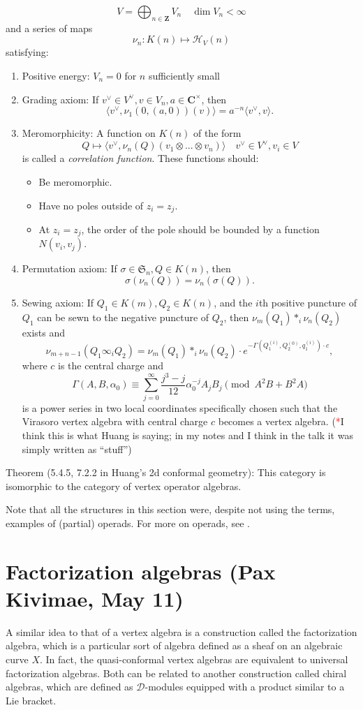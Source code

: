 \documentclass{article}
\newcommand{\CC}{\mathbold{C}}
\newcommand{\ZZ}{\mathbold{Z}}
\newcommand{\Hh}{\mathcal{H}}
\newcommand{\Dd}{\mathcal{D}}
\newcommand{\tk}{\textcolor{red}{*}}
\newcommand{\Sym}{\mathfrak{S}}
\begin{document}
\[V = \bigoplus_{n \in \ZZ} V_n \quad \dim V_n < \infty \]
and a series of maps
\[\nu_n: K(n) \mapsto \Hh_V(n) \]
satisfying:
\begin{enumerate}
\item Positive energy: $V_n=0$ for $n$ sufficiently small
\item Grading axiom: If $v^\vee \in V^\vee, v \in V_n, a \in \CC^\times$, then
  \[\langle v^\vee,\nu_1(0,(a,0))(v)\rangle = a^{-n}\langle v^\vee,v \rangle. \]
\item Meromorphicity: A function on $K(n)$ of the form
  \[Q \mapsto \langle v^\vee, \nu_n(Q)(v_1 \otimes ... \otimes v_n) \rangle \quad v^\vee \in V^\vee, v_i \in V \]
  is called a \textit{correlation function}.  These functions should:
  \begin{itemize}
  \item Be meromorphic.
  \item Have no poles outside of $z_i=z_j$.
  \item At $z_i=z_j$, the order of the pole should be bounded by a function $N(v_i,v_j)$.
  \end{itemize}
\item Permutation axiom: If $\sigma \in \Sym_n, Q \in K(n)$, then
\[\sigma(\nu_n(Q))=\nu_n(\sigma(Q)). \]
\item Sewing axiom: If $Q_1 \in K(m), Q_2 \in K(n)$, and the $i$th positive puncture of $Q_1$ can be sewn to the negative puncture of $Q_2$, then $\nu_m(Q_1) *_i \nu_n(Q_2)$ exists and
\[\nu_{m+n-1}(Q_1 \infty_i Q_2) = \nu_m(Q_1) *_i \nu_n(Q_2) \cdot e^{-\Gamma(Q_1^{(i)},Q_2^{(0)},q_1^{(i)}) \cdot c}, \]
where $c$ is the central charge and
\[\Gamma(A,B,\alpha_0) \equiv \sum_{j=0}^\infty\frac{j^3-j}{12}\alpha_0^{-j}A_jB_j \pmod{A^2B+B^2A} \]
is a power series in two local coordinates specifically chosen such that the Virasoro vertex algebra with central charge $c$ becomes a vertex algebra. (\tk I think this is what Huang is saying; in my notes and I think in the talk it was simply written as ``stuff'') 
\end{enumerate}
Theorem (5.4.5, 7.2.2 in Huang's 2d conformal geometry): This category is isomorphic to the category of vertex operator algebras.

Note that all the structures in this section were, despite not using the terms, examples of (partial) operads. For more on operads, see \cite{MR1898414}.
\section{Factorization algebras (Pax Kivimae, May 11)}
A similar idea to that of a vertex algebra is a construction called the factorization algebra, which is a particular sort of algebra defined as a sheaf on an algebraic curve $X$.  In fact, the quasi-conformal vertex algebras are equivalent to universal factorization algebras.  Both can be related to another construction called chiral algebras, which are defined as $\Dd$-modules equipped with a product similar to a Lie bracket.
\end{document}

